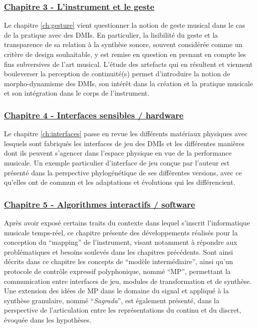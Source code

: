 \subsubsection*{\hyperref[ch:gesture]{Chapitre 3 - L'instrument et le geste}}

\noindent Le chapitre \ref{ch:gesture} vient questionner la notion de geste musical dans le cas de la pratique avec des \glspl{DMI}. En particulier, la lisibilité du geste et la transparence de sa relation à la synthèse sonore, souvent considérée comme un critère de design souhaitable, y est remise en question en prenant en compte les fins subversives de l'art musical. L'étude des artefacts qui en résultent et viennent bouleverser la perception de continuité(s) permet d'introduire la notion de morpho-dynamisme des \glspl{DMI}, son intérêt dans la création et la pratique musicale et son intégration dans le corps de l'instrument.

\subsubsection*{\hyperref[ch:interfaces]{Chapitre 4 - Interfaces sensibles / hardware}}

\noindent Le chapitre \ref{ch:interfaces} passe en revue les différents matériaux physiques avec lesquels sont fabriqués les interfaces de jeu des \glspl{DMI} et les différentes manières dont ils peuvent s'agencer dans l'espace physique en vue de la performance musicale. Un exemple particulier d'interface de jeu conçue par l'auteur est présenté dans la perspective phylogénétique de ses différentes versions, avec ce qu'elles ont de commun et les adaptations et évolutions qui les différencient.

\subsubsection*{\hyperref[ch:algorithms]{Chapitre 5 - Algorithmes interactifs / software}} 

\noindent Après avoir exposé certains traits du contexte dans lequel s'inscrit l'informatique musicale temps-réel, ce chapitre présente des développements réalisés pour la conception du ``mapping'' de l'instrument, visant notamment à répondre aux problématiques et besoins soulevés dans les chapitres précédents. Sont ainsi décrits dans ce chapitre les concepts de ``modèle intermédiaire'', ainsi qu'un protocole de contrôle expressif polyphonique, nommé ``MP'', permettant la communication entre interfaces de jeu, modules de transformation et de synthèse. Une extension des idées de MP dans le domaine du signal et appliqué à la synthèse granulaire, nommé ``\textit{Sagrada}'', est également présenté, dans la perspective de l'articulation entre les représentations du continu et du discret, évoquée dans les hypothèses.

